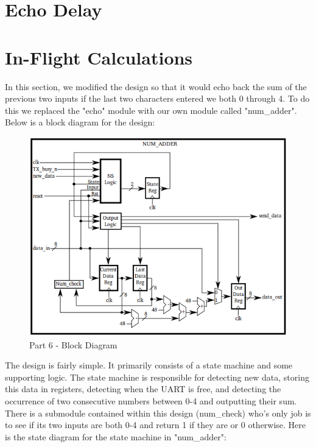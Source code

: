 \documentclass{article}
\begin{document}
\section{Echo Delay}



\section{In-Flight Calculations}
In this section, we modified the design so that it would echo back the sum of the previous two inputs if the last two characters entered we both 0 through 4. To do this we replaced the "echo" module with our own module called "num\_adder". Below is a block diagram for the design: \\


	\begin{figure}[h]
		\begin{center}
			\includegraphics[scale=0.65]{../block_diagrams/part_6_block_diagram_num_adder.png}
			\caption{Part 6 - Block Diagram}
		\end{center}
	\end{figure}

The design is fairly simple. It primarily consists of a state machine and some supporting logic. The state machine is responsible for detecting new data, storing this data in registers, detecting when the UART is free, and detecting the occurrence of two consecutive numbers between 0-4 and outputting their sum. There is a submodule contained within this design (num\_check) who's only job is to see if its two inputs are both 0-4 and return 1 if they are or 0 otherwise. Here is the state diagram for the state machine in "num\_adder": \\
\end{document}
